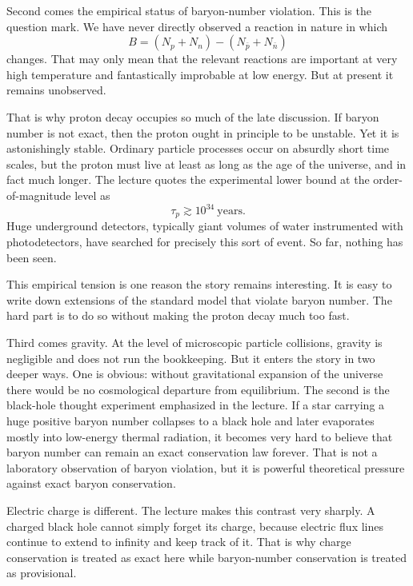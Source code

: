 Second comes the empirical status of baryon-number violation. This is the question mark. We have never directly observed a reaction in nature in which
\begin{equation}
B=(N_p+N_n)-(N_{\bar p}+N_{\bar n})
\end{equation}
changes. That may only mean that the relevant reactions are important at very high temperature and fantastically improbable at low energy. But at present it remains unobserved.

That is why proton decay occupies so much of the late discussion. If baryon number is not exact, then the proton ought in principle to be unstable. Yet it is astonishingly stable. Ordinary particle processes occur on absurdly short time scales, but the proton must live at least as long as the age of the universe, and in fact much longer. The lecture quotes the experimental lower bound at the order-of-magnitude level as
\begin{equation}
\tau_p \gtrsim 10^{34}\ \text{years}.
\end{equation}
Huge underground detectors, typically giant volumes of water instrumented with photodetectors, have searched for precisely this sort of event. So far, nothing has been seen.

This empirical tension is one reason the story remains interesting. It is easy to write down extensions of the standard model that violate baryon number. The hard part is to do so without making the proton decay much too fast.

Third comes gravity. At the level of microscopic particle collisions, gravity is negligible and does not run the bookkeeping. But it enters the story in two deeper ways. One is obvious: without gravitational expansion of the universe there would be no cosmological departure from equilibrium. The second is the black-hole thought experiment emphasized in the lecture. If a star carrying a huge positive baryon number collapses to a black hole and later evaporates mostly into low-energy thermal radiation, it becomes very hard to believe that baryon number can remain an exact conservation law forever. That is not a laboratory observation of baryon violation, but it is powerful theoretical pressure against exact baryon conservation.

Electric charge is different. The lecture makes this contrast very sharply. A charged black hole cannot simply forget its charge, because electric flux lines continue to extend to infinity and keep track of it. That is why charge conservation is treated as exact here while baryon-number conservation is treated as provisional.

